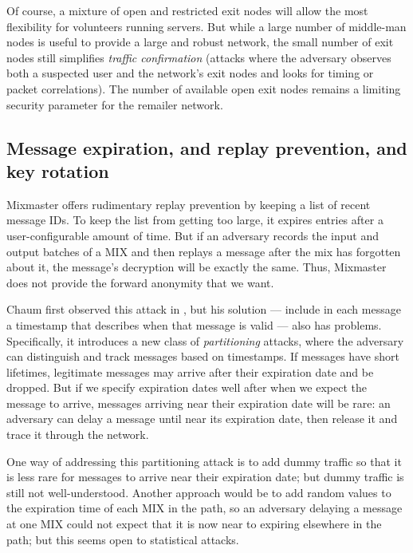 \documentclass{llncs}
\begin{document}
Of course, a mixture of open and restricted exit nodes will allow the
most flexibility for volunteers running servers. But while a large number
of middle-man nodes is useful to provide a large and robust network, the
small number of exit nodes still simplifies \emph{traffic confirmation}
(attacks where the adversary observes both a suspected user and the
network's exit nodes and looks for timing or packet correlations). The
number of available open exit nodes remains a limiting security parameter
for the remailer network.

\subsection{Message expiration, and replay prevention, and key rotation}

Mixmaster offers rudimentary replay prevention by keeping a list of recent
message IDs. To keep the list from getting too large, it expires entries
after a user-configurable amount of time. But if an adversary records
the input and output batches of a MIX and then replays a message after
the mix has forgotten about it, the message's decryption will be exactly
the same. Thus, Mixmaster does not provide the forward anonymity that we want.

Chaum first observed this attack in \cite{chaum-mix}, but his solution
--- include in each message a timestamp that describes when that message
is valid --- also has problems. Specifically, it introduces a new class
of \emph{partitioning} attacks, where the adversary can distinguish and
track messages based on timestamps. If messages have short lifetimes,
legitimate messages may arrive after their expiration date and be
dropped. But if we specify expiration dates well after when we expect the
message to arrive, messages arriving near their expiration date will be
rare: an adversary can delay a message until near its expiration date,
then release it and trace it through the network.



One way of addressing this partitioning attack is to add dummy traffic
so that it is less rare for messages to arrive near their expiration date;
but dummy traffic is still not well-understood. Another approach would
be to add random values to the expiration time of each MIX in the path,
so an adversary delaying a message at one MIX could not expect that it
is now near to expiring elsewhere in the path; but this seems open to
statistical attacks.
\end{document}
